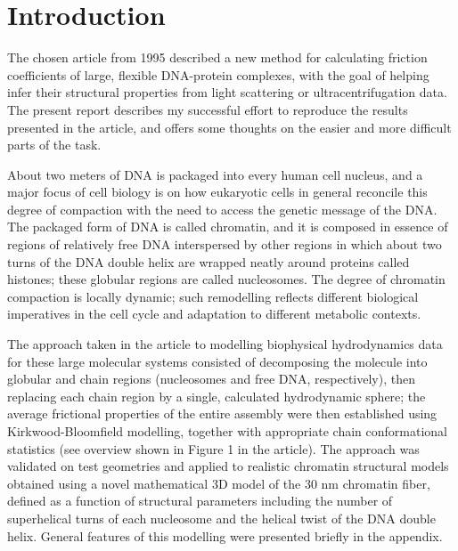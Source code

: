 

\section{Introduction}

The chosen article from 1995\supercite{Robert1995} described a new method for calculating friction coefficients of large, flexible DNA-protein complexes, with the goal of helping infer their structural properties from light scattering or ultracentrifugation data. The present report describes my successful effort to reproduce the results presented in the article, and offers some thoughts on the easier and more difficult parts of the task.

About two meters of DNA is packaged into every human cell nucleus, and a major focus of cell biology is on how eukaryotic cells in general reconcile this degree of compaction with the need to access the genetic message of the DNA. The packaged form of DNA is called chromatin, and it is composed in essence of regions of relatively free DNA interspersed by other regions in which about two turns of the DNA double helix are wrapped neatly around proteins called histones; these globular regions are called nucleosomes. The degree of chromatin compaction is locally dynamic; such remodelling reflects different biological imperatives in the cell cycle and adaptation to different metabolic contexts\supercite{Tian2016}.

The approach taken in the article to modelling biophysical hydrodynamics data for these large molecular systems consisted of decomposing the molecule into globular and chain regions (nucleosomes and free DNA, respectively), then replacing each chain region by a single, calculated hydrodynamic sphere; the average frictional properties of the entire assembly were then established using Kirkwood-Bloomfield modelling\supercite{Bloomfield1977}, together with appropriate chain conformational statistics (see overview shown in Figure 1 in the article). The approach was validated on test geometries and applied to realistic chromatin structural models obtained using a novel mathematical 3D model of the 30 nm chromatin fiber, defined as a function of structural parameters including the number of superhelical turns of each nucleosome and the helical twist of the DNA double helix. General features of this modelling were presented briefly in the appendix.

